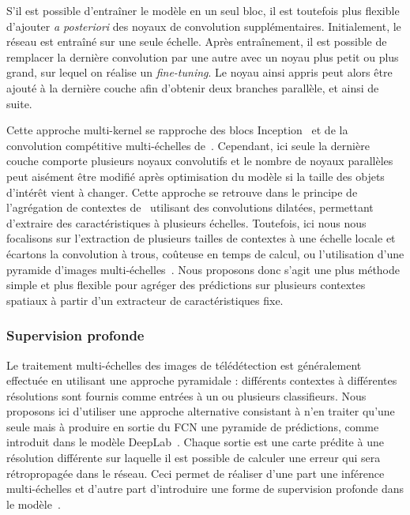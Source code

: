 S'il est possible d'entraîner le modèle en un seul bloc, il est toutefois plus flexible d'ajouter \emph{a posteriori} des noyaux de convolution supplémentaires. Initialement, le réseau est entraîné sur une seule échelle. Après entraînement, il est possible de remplacer la dernière convolution par une autre avec un noyau plus petit ou plus grand, sur lequel on réalise un \emph{fine-tuning}. Le noyau ainsi appris peut alors être ajouté à la dernière couche afin d'obtenir deux branches parallèle, et ainsi de suite.

Cette approche multi-kernel se rapproche des blocs Inception~\cite{szegedy_going_2015} et de la convolution compétitive multi-échelles de~\citet{liao_competitive_2015}. Cependant, ici seule la dernière couche comporte plusieurs noyaux convolutifs et le nombre de noyaux parallèles peut aisément être modifié après optimisation du modèle si la taille des objets d'intérêt vient à changer. Cette approche se retrouve dans le principe de l'agrégation de contextes de~\citet{yu_multi-scale_2015} utilisant des convolutions dilatées, permettant d'extraire des caractéristiques à plusieurs échelles. Toutefois, ici nous nous focalisons sur l'extraction de plusieurs tailles de contextes à une échelle locale et écartons la convolution à trous, coûteuse en temps de calcul, ou l'utilisation d'une pyramide d'images multi-échelles~\cite{zhao_learning_2016}. Nous proposons donc s'agit une plus méthode simple et plus flexible pour agréger des prédictions sur plusieurs contextes spatiaux à partir d'un extracteur de caractéristiques fixe.

\subsubsection{Supervision profonde}
\label{sec:deep_multiscale}

Le traitement multi-échelles des images de télédétection est généralement effectuée en utilisant une approche pyramidale : différents contextes à différentes résolutions sont fournis comme entrées à un ou plusieurs classifieurs. Nous proposons ici d'utiliser une approche alternative consistant à n'en traiter qu'une seule mais à produire en sortie du \gls{FCN} une pyramide de prédictions, comme introduit dans le modèle DeepLab~\cite{l._c._chen_deeplab_2018}. Chaque sortie est une carte prédite à une résolution différente sur laquelle il est possible de calculer une erreur qui sera rétropropagée dans le réseau. Ceci permet de réaliser d'une part une inférence multi-échelles et d'autre part d'introduire une forme de supervision profonde dans le modèle~\cite{lee_deeply-supervised_2015}.

